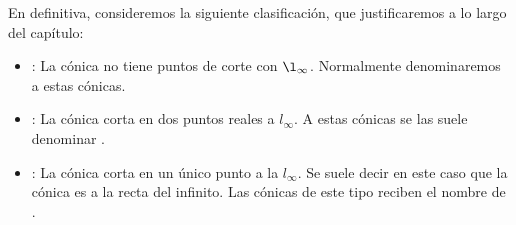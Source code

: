 En definitiva, consideremos la siguiente clasificación, que justificaremos a lo largo del capítulo:
\begin{itemize}
	\item {}: La cónica no tiene puntos de corte con $\l_{\infty}$. Normalmente denominaremos  a estas cónicas.
	\item {}: La cónica corta en dos puntos reales a $l_\infty$. A estas cónicas se las suele denominar .
	\item {}: La cónica corta en un único punto a la $l_\infty$. Se suele decir en este caso que la cónica es  a la recta del infinito. Las cónicas de este tipo reciben el nombre de .
\end{itemize}
\begin{figure}[h]
	\centering

\end{figure}
